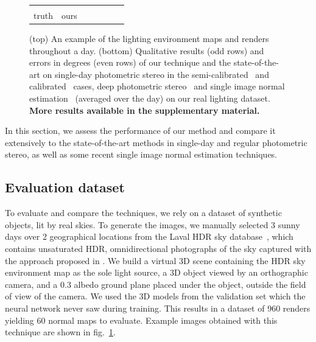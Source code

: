 \begin{figure}
\begin{tabular*}{\linewidth}{@{}c@{}c@{}c@{}c@{}c@{}c@{}c@{}}
\begin{tabular}{@{}c@{}}ground\\truth\end{tabular} & ours & \cite{jung-cvpr-15} & \cite{yu-iccp-13} & \cite{santo-iccv-17} & \cite{wu-nips-17} & \cite{eigen-iccv-15} \\
\end{tabular*}
\egroup
\caption[Lighting environment maps and renders throughout a day]{(top) An example of the lighting environment maps and renders throughout a day. (bottom) Qualitative results (odd rows) and errors in degrees (even rows) of our technique and the state-of-the-art on single-day photometric stereo in the semi-calibrated~\cite{jung-cvpr-15} and calibrated~\cite{yu-iccp-13} cases, deep photometric stereo~\cite{santo-iccv-17} and single image normal estimation~\cite{wu-nips-17,eigen-iccv-15} (averaged over the day) on our real lighting dataset. \textbf{More results available in the supplementary material.}}
\label{fig:results-qualitative}
\end{figure}


In this section, we assess the performance of our method and compare it extensively to the state-of-the-art methods in single-day and regular photometric stereo, as well as some recent single image normal estimation techniques.

\subsection{Evaluation dataset}
\label{sec:evaluation_dataset}

To evaluate and compare the techniques, we rely on a dataset of synthetic objects, lit by real skies. To generate the images, we manually selected 3 sunny days over 2 geographical locations from the Laval HDR sky database~\cite{hdrdb}, which contains unsaturated HDR, omnidirectional photographs of the sky captured with the approach proposed in \cite{stumpfel-afrigraph-04}. We build a virtual 3D scene containing the HDR sky environment map as the sole light source, a 3D object viewed by an orthographic camera, and a 0.3 albedo ground plane placed under the object, outside the field of view of the camera. We used the 3D models from the validation set which the neural network never saw during training. This results in a dataset of 960 renders yielding 60 normal maps to evaluate. Example images obtained with this technique are shown in fig.~\ref{fig:results-qualitative}. 


